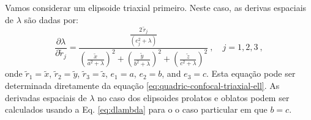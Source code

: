 Vamos considerar um elipsoide triaxial primeiro. Neste caso, as derivas espaciais de $\lambda$
são dadas por:
\begin{equation}
\frac{\partial \lambda}{\partial \tilde{r}_{j}} =
\frac{\frac{2 \, \tilde{r}_{j}}{\left( e_{j}^{2} + \lambda \right)}}{
	\left( \frac{\tilde{x}}{a^{2} + \lambda}\right)^{2} +
	\left( \frac{\tilde{y}}{b^{2} + \lambda}\right)^{2} + 
	\left( \frac{\tilde{z}}{c^{2} + \lambda}\right)^{2}} \: , \quad j = 1, 2, 3 \: ,
\label{eq:dlambda}
\end{equation}
onde 
$\tilde{r}_{1} = \tilde{x}$, $\tilde{r}_{2} = \tilde{y}$, $\tilde{r}_{3} = \tilde{z}$,
$e_{1} = a$, $e_{2} = b$, and $e_{3} = c$.
Esta equação pode ser determinada diretamente da equação \ref{eq:quadric-confocal-triaxial-ell}.
As derivadas espaciais de $\lambda$ no caso dos elipsoides prolatos e oblatos podem ser calculados usando
a Eq. \ref{eq:dlambda} para o o caso particular em que $b = c$.
